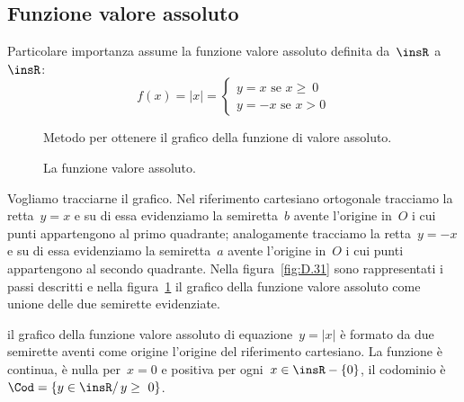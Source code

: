 \subsection{Funzione valore assoluto}
Particolare importanza assume la funzione valore assoluto definita da~$\insR$ 
a~$\insR$:
\[
f(x)=|x|=\left\{\begin{array}{l}
y=x\text{ se }x\ge~0\\
y=-x\text{ se }x>0\end{array}\right.
\]

\begin{inaccessibleblock}
 \begin{figure}[h]
\begin{minipage}[t]{.45\textwidth}
\centering
\caption{Metodo per ottenere il grafico della funzione di valore 
assoluto.}\label{fig:D.31}
\end{minipage}\hfil
\begin{minipage}[t]{.45\textwidth}
\centering
\caption{La funzione valore assoluto.}\label{fig:D.32}
\end{minipage}
\end{figure}
\end{inaccessibleblock}

Vogliamo tracciarne il grafico. Nel riferimento cartesiano ortogonale tracciamo 
la retta~$y=x$ e su di essa evidenziamo
la semiretta~$b$ avente l'origine in~$O$ i cui punti appartengono al primo 
quadrante; analogamente tracciamo la retta~$y=-x$
e su di essa evidenziamo la semiretta~$a$ avente l'origine in~$O$ i cui punti 
appartengono al secondo quadrante.
Nella figura~\ref{fig:D.31} sono rappresentati i passi descritti e nella 
figura~\ref{fig:D.32} il grafico della funzione valore assoluto come unione 
delle due semirette evidenziate.

\conclusione il grafico della funzione valore assoluto di equazione~$y=|x|$ è 
formato da due semirette aventi come origine
l'origine del riferimento cartesiano. La funzione è continua, è nulla per~$x=0$ 
e positiva per ogni~$x\in \insR-\{0\}$,
il codominio è~$\Cod=\{y\in \insR/\, y\ge~0\}$.

